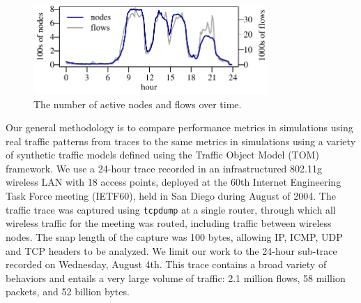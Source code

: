 \documentclass[conference]{IEEEtran}
\newcommand{\caps}[1]{{\small{#1}}}
\begin{document}
\begin{figure}
\vspace{0.45em}
\begin{center}
\includegraphics[width=3.5in]{nodes-flows}%
\vspace{-0.75em}%
\caption{The number of active nodes and flows over time.} 
\label{fig:nodes-flows}
\end{center}
\vspace{-2em}
\end{figure}

Our general methodology is to compare performance metrics in simulations using real traffic patterns from traces to the same metrics in simulations using a variety of synthetic traffic models defined using the Traffic Object Model (\caps{TOM}) framework. We use a 24-hour trace recorded in an infrastructured 802.11g wireless \caps{LAN} with 18 access points, deployed at the 60th Internet Engineering Task Force meeting (\caps{IETF}60), held in San Diego during August of 2004. The traffic trace was captured using \texttt{\small{tcpdump}} at a single router, through which all wireless traffic for the meeting was routed, including traffic between wireless nodes. The snap length of the capture was 100 bytes, allowing \caps{IP}, \caps{ICMP}, \caps{UDP} and \caps{TCP} headers to be analyzed. We limit our work to the 24-hour sub-trace recorded on Wednesday, August 4th. This trace contains a broad variety of behaviors and entails a very large volume of traffic: 2.1 million flows, 58 million packets, and 52 billion bytes.
\end{document}

